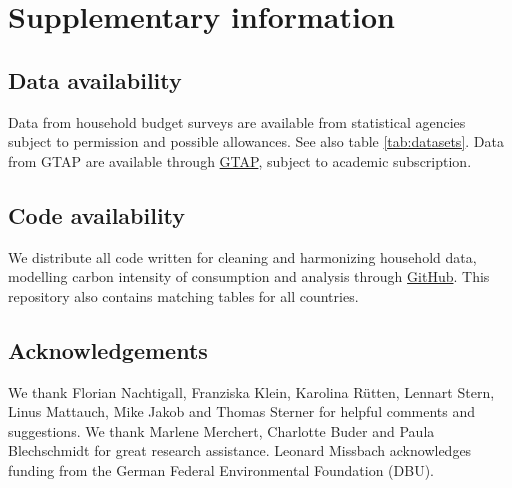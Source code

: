 \documentclass[12pt, a4paper]{article}
\begin{document}
\begin{refsection}

\clearpage


\clearpage


\clearpage


\clearpage

\begin{refcontext}[sorting=nyt]
\printbibliography[heading=subbibliography, title ={References (Appendix)}]
\end{refcontext}
\end{refsection}

\clearpage

\section{Supplementary information}

\subsection{Data availability} \label{data_availability} Data from household budget surveys are available from statistical agencies subject to permission and possible allowances. See also table \ref{tab:datasets}. Data from GTAP are available through \href{https://www.gtap.agecon.purdue.edu/}{GTAP}, subject to academic subscription.  

\subsection{Code availability} \label{code}
We distribute all code written for cleaning and harmonizing household data, modelling carbon intensity of consumption and analysis through \href{https://github.com/lmissbach/Carbon-Intensity-2023}{GitHub}. This repository also contains matching tables for all countries.

\subsection{Acknowledgements} \label{acknowledgements}

We thank Florian Nachtigall, Franziska Klein, Karolina Rütten, Lennart Stern, Linus Mattauch, Mike Jakob and Thomas Sterner for helpful comments and suggestions. 
We thank Marlene Merchert, Charlotte Buder and Paula Blechschmidt for great research assistance. 
Leonard Missbach acknowledges funding from the German Federal Environmental Foundation (DBU).

\end{document}
